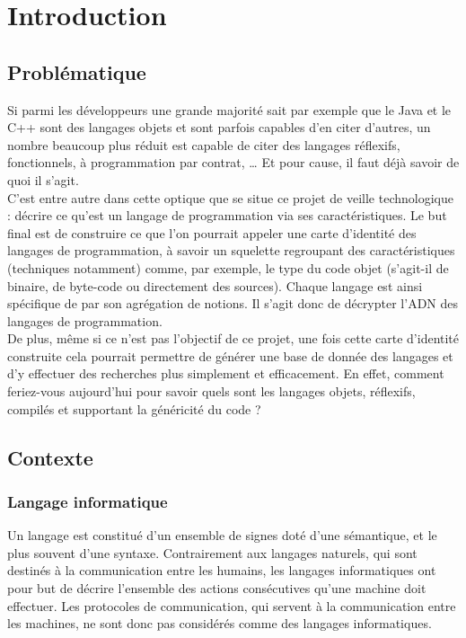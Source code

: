 \section{Introduction}

\subsection{Problématique}
Si parmi les développeurs une grande majorité sait par exemple que le Java et le C++ sont des langages objets et sont parfois capables d'en citer d'autres, un nombre beaucoup plus réduit est capable de citer des langages réflexifs, fonctionnels, à programmation par contrat, …
Et pour cause, il faut déjà savoir de quoi il s'agit.\\

C'est entre autre dans cette optique que se situe ce projet de veille technologique : décrire ce qu'est un langage de programmation via ses caractéristiques.
Le but final est de construire ce que l'on pourrait appeler une carte d'identité des langages de programmation, à savoir un squelette regroupant des caractéristiques (techniques notamment) comme, par exemple, le type du code objet (s'agit-il de binaire, de byte-code ou directement des sources).
Chaque langage est ainsi spécifique de par son agrégation de notions. Il s'agit donc de décrypter l'ADN des langages de programmation.\\

De plus, même si ce n'est pas l'objectif de ce projet, une fois cette carte d'identité construite cela pourrait permettre de générer une base de donnée des langages et d'y effectuer des recherches plus simplement et efficacement.
En effet, comment feriez-vous aujourd'hui pour savoir quels sont les langages objets, réflexifs, compilés et supportant la généricité du code ?

\subsection{Contexte}

\subsubsection{Langage informatique}

Un langage est constitué d’un ensemble de signes doté d’une sémantique, et le plus souvent d’une syntaxe. Contrairement aux langages naturels, qui sont destinés à la communication entre les humains, les langages informatiques ont pour but de décrire l’ensemble des actions consécutives qu’une machine doit effectuer. Les protocoles de communication, qui servent à la communication entre les machines, ne sont donc pas considérés comme des langages informatiques.\\

